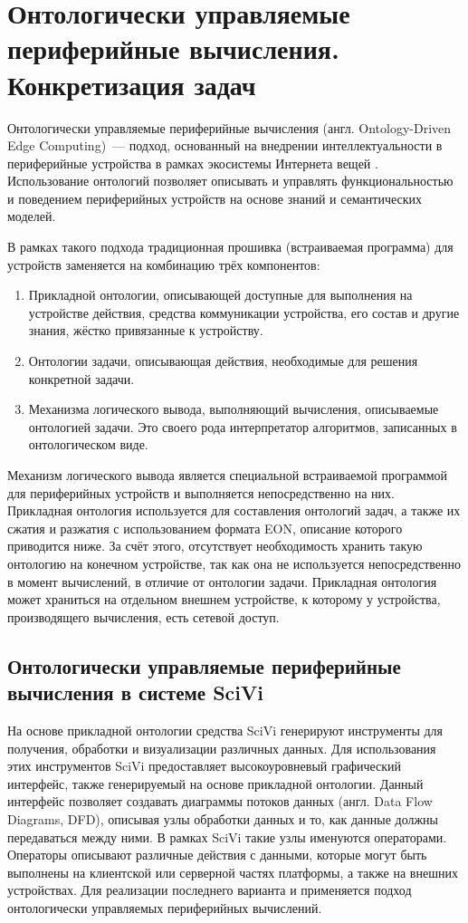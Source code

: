 \chapter{Онтологически управляемые периферийные вычисления. Конкретизация задач}

Онтологически управляемые периферийные вычисления (англ. Ontology-Driven Edge Computing)~--- подход, основанный на внедрении интеллектуальности в периферийные устройства в рамках экосистемы Интернета вещей \cite{incollection:onto-reasoning-on-mcu}.
Использование онтологий позволяет описывать и управлять функциональностью и поведением периферийных устройств на основе знаний и семантических моделей.

В рамках такого подхода традиционная прошивка (встраиваемая программа) для устройств заменяется на комбинацию трёх компонентов:
\begin{enumerate}
	\item Прикладной онтологии, описывающей доступные для выполнения на устройстве действия, средства коммуникации устройства, его состав и другие знания, жёстко привязанные к устройству.
	\item Онтологии задачи, описывающая действия, необходимые для решения конкретной задачи.
	\item Механизма логического вывода, выполняющий вычисления, описываемые онтологией задачи.
	Это своего рода интерпретатор алгоритмов, записанных в онтологическом виде.
\end{enumerate}

Механизм логического вывода является специальной встраиваемой программой для периферийных устройств и выполняется непосредственно на них.
Прикладная онтология используется для составления онтологий задач, а также их сжатия и разжатия с использованием формата EON, описание которого приводится ниже.
За счёт этого, отсутствует необходимость хранить такую онтологию на конечном устройстве, так как она не используется непосредственно в момент вычислений, в отличие от онтологии задачи.
Прикладная онтология может храниться на отдельном внешнем устройстве, к которому у устройства, производящего вычисления, есть сетевой доступ.

\section{Онтологически управляемые периферийные вычисления в системе SciVi}

На основе прикладной онтологии средства SciVi генерируют инструменты для получения, обработки и визуализации различных данных.
Для использования этих инструментов SciVi предоставляет высокоуровневый графический интерфейс, также генерируемый на основе прикладной онтологии.
Данный интерфейс позволяет создавать диаграммы потоков данных (англ. Data Flow Diagrams, DFD), описывая узлы обработки данных и то, как данные должны передаваться между ними.
В рамках SciVi такие узлы именуются операторами.
Операторы описывают различные действия с данными, которые могут быть выполнены на клиентской или серверной частях платформы, а также на внешних устройствах.
Для реализации последнего варианта и применяется подход онтологически управляемых периферийных вычислений.

